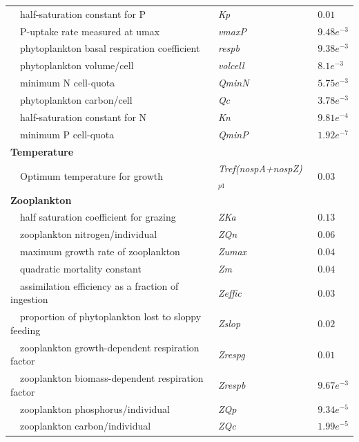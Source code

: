 \documentclass[review]{elsarticle}\usepackage[]{graphicx}\usepackage[]{color}
\begin{document}
\begin{table}[!tbp]
{\begin{center}
\begin{tabular}{lll}
~~half-saturation constant for P&\textit{Kp}&$0.01$\tabularnewline
~~P-uptake rate measured at umax&\textit{vmaxP}&$9.48e^{-3}$\tabularnewline
~~phytoplankton basal respiration coefficient&\textit{respb}&$9.38e^{-3}$\tabularnewline
~~phytoplankton volume/cell&\textit{volcell}&$8.1e^{-3}$\tabularnewline
~~minimum N cell-quota&\textit{QminN}&$5.75e^{-3}$\tabularnewline
~~phytoplankton carbon/cell&\textit{Qc}&$3.78e^{-3}$\tabularnewline
~~half-saturation constant for N&\textit{Kn}&$9.81e^{-4}$\tabularnewline
~~minimum P cell-quota&\textit{QminP}&$1.92e^{-7}$\tabularnewline
\hline
{\bfseries Temperature}&&\tabularnewline
~~Optimum temperature for growth&\textit{Tref(nospA+nospZ)$_{p1}$}&$0.03$\tabularnewline
\hline
{\bfseries Zooplankton}&&\tabularnewline
~~half saturation coefficient for grazing&\textit{ZKa}&$0.13$\tabularnewline
~~zooplankton nitrogen/individual&\textit{ZQn}&$0.06$\tabularnewline
~~maximum growth rate of zooplankton&\textit{Zumax}&$0.04$\tabularnewline
~~quadratic mortality constant&\textit{Zm}&$0.04$\tabularnewline
~~assimilation efficiency as a fraction of ingestion&\textit{Zeffic}&$0.03$\tabularnewline
~~proportion of phytoplankton lost to sloppy feeding&\textit{Zslop}&$0.02$\tabularnewline
~~zooplankton growth-dependent respiration factor&\textit{Zrespg}&$0.01$\tabularnewline
~~zooplankton biomass-dependent respiration factor&\textit{Zrespb}&$9.67e^{-3}$\tabularnewline
~~zooplankton phosphorus/individual&\textit{ZQp}&$9.34e^{-5}$\tabularnewline
~~zooplankton carbon/individual&\textit{ZQc}&$1.99e^{-5}$\tabularnewline
\hline
\end{tabular}\end{center}}
\end{table}
\end{document}
